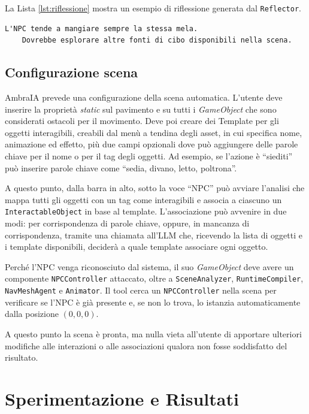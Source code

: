 La Lista \ref{lst:riflessione} mostra un esempio di riflessione generata dal \texttt{Reflector}.

\begin{lstlisting}[style=jsonstyle, caption={Esempio di riflessione generata dal Reflector.}, label={lst:riflessione}]
	L'NPC tende a mangiare sempre la stessa mela.
	Dovrebbe esplorare altre fonti di cibo disponibili nella scena.
\end{lstlisting}

\section{Configurazione scena}

AmbraIA prevede una configurazione della scena automatica. L'utente deve inserire la proprietà \textit{static} sul pavimento e su tutti i \textit{GameObject} che sono considerati ostacoli per il movimento. Deve poi creare dei Template per gli oggetti interagibili, creabili dal menù a tendina degli asset, in cui specifica nome, animazione ed effetto, più due campi opzionali dove può aggiungere delle parole chiave per il nome o per il tag degli oggetti. Ad esempio, se l'azione è ``siediti'' può inserire parole chiave come ``sedia, divano, letto, poltrona''.

A questo punto, dalla barra in alto, sotto la voce ``NPC'' può avviare l'analisi che mappa tutti gli oggetti con un tag come interagibili e associa a ciascuno un \texttt{InteractableObject} in base al template. L'associazione può avvenire in due modi: per corrispondenza di parole chiave, oppure, in mancanza di corrispondenza, tramite una chiamata all'LLM che, ricevendo la lista di oggetti e i template disponibili, deciderà a quale template associare ogni oggetto.

Perché l'NPC venga riconosciuto dal sistema, il suo \textit{GameObject} deve avere un componente \texttt{NPCController} attaccato, oltre a \texttt{SceneAnalyzer}, \texttt{RuntimeCompiler}, \texttt{NavMeshAgent} e \texttt{Animator}. Il tool cerca un \texttt{NPCController} nella scena per verificare se l'NPC è già presente e, se non lo trova, lo istanzia automaticamente dalla posizione $(0,0,0)$.

A questo punto la scena è pronta, ma nulla vieta all'utente di apportare ulteriori modifiche alle interazioni o alle associazioni qualora non fosse soddisfatto del risultato.

\chapter{Sperimentazione e Risultati}
\label{cap:risultati}


